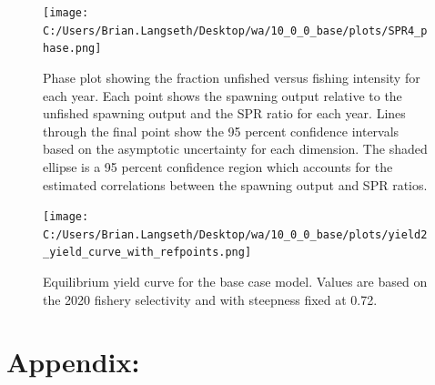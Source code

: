 \documentclass[11pt,
  english,
  letterpaper,
]{article}
\begin{document}
\tagmcend\tagstructend


\begin{figure}
\centering
\texttt{[image: C:/Users/Brian.Langseth/Desktop/wa/10\_0\_0\_base/plots/SPR4\_phase.png]}
\caption{Phase plot showing the fraction unfished versus fishing intensity for each year. Each point shows the spawning output relative to the unfished spawning output and the SPR ratio for each year. Lines through the final point show the 95 percent confidence intervals based on the asymptotic uncertainty for each dimension. The shaded ellipse is a 95 percent confidence region which accounts for the estimated correlations between the spawning output and SPR ratios.\label{fig:phase-plot}}
\end{figure}

\tagmcend\tagstructend


\begin{figure}
\centering
\texttt{[image: C:/Users/Brian.Langseth/Desktop/wa/10\_0\_0\_base/plots/yield2\_yield\_curve\_with\_refpoints.png]}
\caption{Equilibrium yield curve for the base case model. Values are based on the 2020 fishery selectivity and with steepness fixed at 0.72.\label{fig:yield}}
\end{figure}

\tagmcend\tagstructend

\newpage

\clearpage


\hypertarget{appendix}{%
\section{Appendix:}\label{appendix}}

\leavevmode\tagmcend\tagstructend

\end{document}
